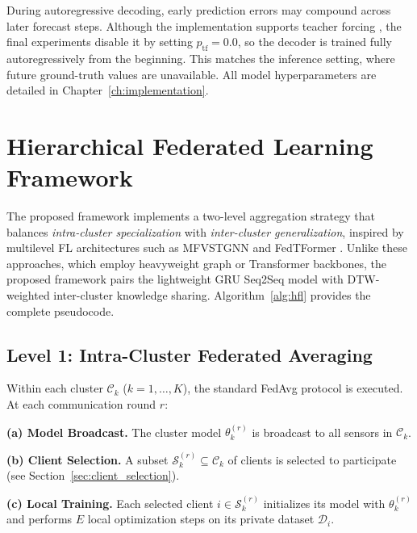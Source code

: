 During autoregressive decoding, early prediction errors may compound across later forecast steps. Although the implementation supports teacher forcing \cite{williams1989}, the final experiments disable it by setting $p_{\text{tf}}=0.0$, so the decoder is trained fully autoregressively from the beginning. This matches the inference setting, where future ground-truth values are unavailable. All model hyperparameters are detailed in Chapter~\ref{ch:implementation}.



\section{Hierarchical Federated Learning Framework}
\label{sec:fl_framework}

The proposed framework implements a two-level aggregation strategy that balances \textit{intra-cluster specialization} with \textit{inter-cluster generalization}, inspired by multilevel FL architectures such as MFVSTGNN \cite{liu2023mfvstgnn} and FedTFormer \cite{shuai2025fedtformer}. Unlike these approaches, which employ heavyweight graph or Transformer backbones, the proposed framework pairs the lightweight GRU Seq2Seq model with DTW-weighted inter-cluster knowledge sharing. Algorithm~\ref{alg:hfl} provides the complete pseudocode.

\subsection{Level 1: Intra-Cluster Federated Averaging}
Within each cluster $\mathcal{C}_k$ ($k = 1, \dots, K$), the standard FedAvg protocol \cite{mcmahan2017} is executed. At each communication round $r$:

\textbf{(a) Model Broadcast.} The cluster model $\theta_k^{(r)}$ is broadcast to all sensors in $\mathcal{C}_k$.

\textbf{(b) Client Selection.} A subset $\mathcal{S}_k^{(r)} \subseteq \mathcal{C}_k$ of clients is selected to participate (see Section~\ref{sec:client_selection}).

\textbf{(c) Local Training.} Each selected client $i \in \mathcal{S}_k^{(r)}$ initializes its model with $\theta_k^{(r)}$ and performs $E$ local optimization steps on its private dataset $\mathcal{D}_i$.

